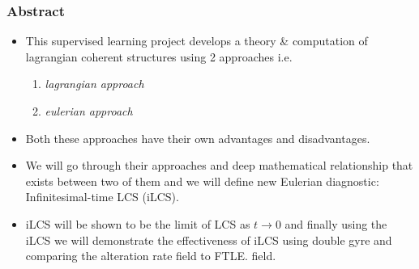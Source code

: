\documentclass[../presentation.tex]{subfiles}
\begin{document}
\begin{frame}[t]
  \frametitle{Abstract}
  \begin{itemize}
    \item This supervised learning project develops a theory \& computation of lagrangian coherent structures using 2 approaches i.e.
    \begin{enumerate}
      \item \textit{lagrangian approach}
      \item \textit{eulerian approach} 
    \end{enumerate}
  
    \item Both these approaches have their own advantages and disadvantages.
    
    \item We will go through their approaches and deep mathematical relationship that exists between two of them and we will define new Eulerian diagnostic: Infinitesimal-time LCS (iLCS).
    
    \item iLCS will be shown to be the limit of LCS as \(t \rightarrow 0\) and finally using the iLCS we will demonstrate the effectiveness of iLCS using double gyre and comparing the alteration rate field to FTLE. field.
  \end{itemize}  
\end{frame}
\end{document}
